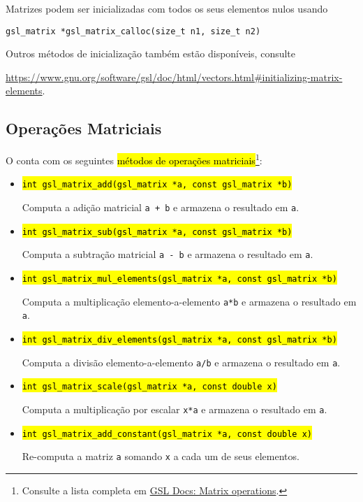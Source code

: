 \documentclass[12pt]{article}
\begin{document}
\begin{obs}
  Matrizes podem ser inicializadas com todos os seus elementos nulos usando
\begin{lstlisting}
gsl_matrix *gsl_matrix_calloc(size_t n1, size_t n2)
\end{lstlisting}
  Outros métodos de inicialização também estão disponíveis, consulte
  \begin{center}
    \url{https://www.gnu.org/software/gsl/doc/html/vectors.html#initializing-matrix-elements}.
  \end{center}
\end{obs}

\subsection{Operações Matriciais}

O {\gsl} conta com os seguintes \hl{métodos de operações matriciais}\footnote{Consulte a lista completa em \href{https://www.gnu.org/software/gsl/doc/html/vectors.html\#matrix-operations}{GSL Docs: Matrix operations}.}:
\begin{itemize}
\item \hl{\texttt{int gsl\_matrix\_add(gsl\_matrix *a, const gsl\_matrix *b)}}

  Computa a adição matricial \lstinline!a + b! e armazena o resultado em \lstinline!a!.

\item \hl{\texttt{int gsl\_matrix\_sub(gsl\_matrix *a, const gsl\_matrix *b)}}

  Computa a subtração matricial \lstinline!a - b! e armazena o resultado em \lstinline!a!.

\item \hl{\texttt{int gsl\_matrix\_mul\_elements(gsl\_matrix *a, const gsl\_matrix *b)}}

  Computa a multiplicação elemento-a-elemento \lstinline!a*b! e armazena o resultado em \lstinline!a!.

\item \hl{\texttt{int gsl\_matrix\_div\_elements(gsl\_matrix *a, const gsl\_matrix *b)}}

  Computa a divisão elemento-a-elemento \lstinline!a/b! e armazena o resultado em \lstinline!a!.

\item \hl{\texttt{int gsl\_matrix\_scale(gsl\_matrix *a, const double x)}}

  Computa a multiplicação por escalar \lstinline!x*a! e armazena o resultado em \lstinline!a!.

\item \hl{\texttt{int gsl\_matrix\_add\_constant(gsl\_matrix *a, const double x)}}

  Re-computa a matriz \lstinline+a+ somando \lstinline+x+ a cada um de seus elementos.
\end{itemize}
\end{document}
